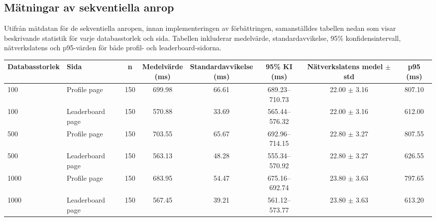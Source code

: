 \documentclass[letterpaper,twocolumn,10pt]{article}
\begin{document}
\subsection{Mätningar av sekventiella anrop}

\noindent
\begin{minipage}[t]{\columnwidth}
Utifrån mätdatan för de sekventiella anropen, innan implementeringen av
förbättringen, samanställdes tabellen nedan som visar beskrivande statistik för
varje databasstorlek och sida. Tabellen inkluderar medelvärde,
standardavvikelse, 95\% konfidensintervall, nätverkslatens och p95-värden för
både profil- och leaderboard-sidorna.
\end{minipage}

\vspace*{1.0\baselineskip}

\begin{strip}
  \centering
  \footnotesize
  \setlength{\tabcolsep}{4pt}
    \begin{tabular}{@{}l l c c c c c c@{}}
        \toprule
          Databasstorlek & Sida & n & \shortstack{Medelvärde\\(ms)} &
          \shortstack{Standardavvikelse\\(ms)} & \shortstack{95\% KI\\(ms)} &
          \shortstack{Nätverkslatens\\medel $\pm$ std} & p95 (ms)    \\
        \midrule
            100         & Profile page & 150 & 699.98 & 66.61 &
            689.23--710.73 & 22.00 $\pm$ 3.16 & 807.10 \\
            100         & Leaderboard page  & 150 & 570.88 & 33.69 &
            565.44--576.32 & 22.00 $\pm$ 3.16 & 612.00 \\
            500         & Profile page & 150 & 703.55 & 65.67 &
            692.96--714.15 & 22.80 $\pm$ 3.27 & 807.55  \\
            500         & Leaderboard page  & 150 & 563.13 & 48.28 &
            555.34--570.92 & 22.80 $\pm$ 3.27 & 626.55 \\
            1000         & Profile page & 150 & 683.95 & 54.47 &
            675.16--692.74 & 23.80 $\pm$ 3.63 & 797.65 \\
            1000         & Leaderboard page  & 150 & 567.45 & 39.21 &
            561.12--573.77 & 23.80 $\pm$ 3.63 & 613.20 \\
        \bottomrule
    \end{tabular}
  \label{tab:sekventiell}
\end{strip}
\end{document}
